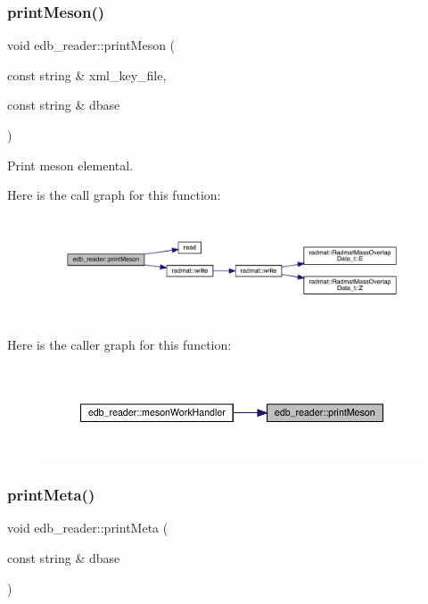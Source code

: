 \subsubsection{\texorpdfstring{printMeson()}{printMeson()}}
{\footnotesize\ttfamily void edb\+\_\+reader\+::print\+Meson (\begin{DoxyParamCaption}\item[{const string \&}]{xml\+\_\+key\+\_\+file,  }\item[{const string \&}]{dbase }\end{DoxyParamCaption})}



Print meson elemental. 

Here is the call graph for this function\+:
\nopagebreak
\begin{figure}[H]
\begin{center}
\leavevmode
\includegraphics[width=350pt]{d8/d4f/namespaceedb__reader_a15f77d6bf819d626b19549dbd921c1b0_cgraph}
\end{center}
\end{figure}
Here is the caller graph for this function\+:
\nopagebreak
\begin{figure}[H]
\begin{center}
\leavevmode
\includegraphics[width=350pt]{d8/d4f/namespaceedb__reader_a15f77d6bf819d626b19549dbd921c1b0_icgraph}
\end{center}
\end{figure}
\mbox{\label{namespaceedb__reader_a9caf0c894a49fc4a9829aead7ec614fd}} 
\subsubsection{\texorpdfstring{printMeta()}{printMeta()}}
{\footnotesize\ttfamily void edb\+\_\+reader\+::print\+Meta (\begin{DoxyParamCaption}\item[{const string \&}]{dbase }\end{DoxyParamCaption})}



